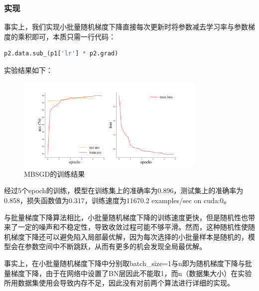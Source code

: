 \documentclass[10.5pt,a4paper]{article}%
\begin{document}
            \subsubsection{实现}
            事实上，我们实现小批量随机梯度下降直接每次更新时将参数减去学习率与参数梯度的乘积即可，本质只需一行代码：
            \begin{lstlisting}[language=python]
            p2.data.sub_(p1['lr'] * p2.grad)
            \end{lstlisting}
\newpage
            实验结果如下：
            \begin{figure}[H]
            \centering
                \includegraphics[width=0.8\textwidth]{imgs_5e/SGD.png}
              \caption{MBSGD的训练结果}
              \label{fig:SGD}
            \end{figure}  
            经过5个epoch的训练，模型在训练集上的准确率为0.896，测试集上的准确率为0.858，损失函数值为0.317，训练速度为11670.2 examples/sec on cuda:0。\par
            与批量梯度下降算法相比，小批量随机梯度下降的训练速度更快，但是随机性也带来了一定的噪声和不稳定性，导致收敛过程可能不够平滑。然而，这种随机性使随机梯度下降还可以避免陷入局部最优解，因为每次选择的小批量样本是随机的，模型会在参数空间中不断跳跃，从而有更多的机会发现全局最优解。\par
            事实上，在小批量随机梯度下降中分别取batch\_size=1与n即为随机梯度下降与批量梯度下降，由于在网络中设置了BN层因此不能取1，而n（数据集大小）在实验所用数据集使用会导致内存不足，因此没有对前两个算法进行详细的实现。
\end{document}
